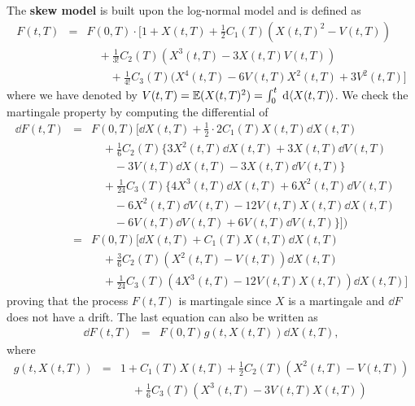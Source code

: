 \documentclass[12pt]{article}
\begin{document}
\noindent
The {\bf skew model} is built upon the log-normal model and is defined as
\begin {eqnarray}
  F(t,T) & = & F(0,T) \cdot [ 1 + X(t,T) + \frac 1 2 C_1 (T) (X(t,T)^2 - V(t,T)) 
  \nonumber
  \\
  &  & \quad + 
  \frac 1 {3!} C_2 (T) (X^3 (t,T) - 3 X(t,T) V(t,T)) 
  \nonumber
  \\
  &  & \qquad + 
  \frac 1 {4!} C_3 (T) (X^4(t,T) - 6 V(t,T) X^2 (t,T) + 3 V^2 (t,T) ]
  \label {skew_model_eq}
\end {eqnarray}
where we have denoted by $V(t,T) = \mathbb {E}( X(t,T)^2 ) = 
\int_0^t \; \mbox {{\rm d}} \langle X(t,T) \rangle  $. 
We check the martingale property by computing the differential of 
\begin {eqnarray}
  \dd F(t,T) & = & F(0,T) [ \dd X(t,T) + 
    \frac 1 2 \cdot 2 C_1 (T) X(t,T) \dd X(t,T) 
    \nonumber
    \\
    &  & \quad 
    + \frac 1 6 C_2 (T) \{ 3 X^2 (t,T) \dd X(t,T) + 3 X(t,T) \dd V(t,T) 
    \nonumber
    \\
    &  & \qquad 
    - 3 V(t,T) \dd X(t,T) - 3 X(t,T) \dd V(t,T) \}
    \nonumber
    \\
    &  & \quad 
    + \frac 1 {24} C_3 (T) \{ 4 X^3 (t,T) \dd X(t,T) + 6 X^2 (t,T) \dd V(t,T) 
    \nonumber
    \\
    &  & \qquad 
    - 6 X^2 (t,T) \dd V(t,T) - 12 V(t,T) X(t,T) \dd X(t,T)  
    \nonumber
    \\
    &  & \qquad 
    - 6 V(t,T) \dd V(t,T) + 6 V(t,T) \dd V(t,T) \} ]
  )
  \nonumber
  \\
  & = & 
  F(0,T) [ \dd X(t,T) + C_1 (T) X(t,T) \dd X(t,T) 
  \nonumber
  \\
  &  & \quad 
  + \frac 3 6 C_2 (T) ( X^2 (t,T) - V(t,T) ) \dd X(t,T) 
  \nonumber
  \\
  &  & \quad 
  + \frac 1 {24} C_3 (T) ( 4 X^3 (t,T) - 12 V(t,T) X(t,T) ) \dd X(t,T) ]
  \label {F_skew_diff}
\end {eqnarray}
proving that the process $F(t,T)$ is martingale since $X$ is a martingale 
and $\dd F$ does not have a drift. The last equation can also be written 
as 
\begin {eqnarray}
  \dd F(t,T) & = & F(0,T) g(t,X(t,T)) \dd X(t,T),
\end {eqnarray}
where 
\begin {eqnarray*}
  g(t,X(t,T)) & = &  1 + C_1 (T) X(t,T) + 
  \frac 1 2  C_2 (T) ( X^2 (t,T) - V(t,T) ) 
  \\
  &  & \quad +
  \frac 1 6 C_3 (T) ( X^3(t,T) - 3 V(t,T) X(t,T) ) 
\end {eqnarray*}
\end{document}
